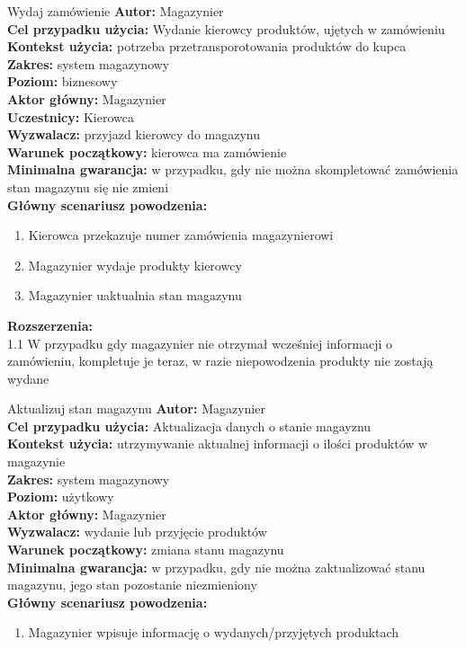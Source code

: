 \begin{usecase}{Wydaj zamówienie}
	\textbf{Autor:} Magazynier\\
	\textbf{Cel przypadku użycia:} Wydanie kierowcy produktów, ujętych w zamówieniu \\
	\textbf{Kontekst użycia:} potrzeba przetransporotowania produktów do kupca\\
	\textbf{Zakres:} system magazynowy \\
	\textbf{Poziom:} biznesowy \\
	\textbf{Aktor główny:} Magazynier \\
	\textbf{Uczestnicy:} Kierowca \\
	\textbf{Wyzwalacz:} przyjazd kierowcy do magazynu \\
	\textbf{Warunek początkowy:} kierowca ma zamówienie \\
	\textbf{Minimalna gwarancja:} w przypadku, gdy nie można skompletować zamówienia stan magazynu się nie zmieni \\
	\textbf{Główny scenariusz powodzenia:} 
		\begin{enumerate}
			\item Kierowca przekazuje numer zamówienia magazynierowi
			\item Magazynier wydaje produkty kierowcy
			\item Magazynier uaktualnia stan magazynu
		\end{enumerate}
	\textbf{Rozszerzenia:} \\
	1.1 W przypadku gdy magazynier nie otrzymał wcześniej informacji o zamówieniu, kompletuje je teraz, w razie niepowodzenia produkty nie zostają wydane\\
\end{usecase}

\begin{usecase}{Aktualizuj stan magazynu}
	\textbf{Autor:} Magazynier\\
	\textbf{Cel przypadku użycia:} Aktualizacja danych o stanie magayznu \\
	\textbf{Kontekst użycia:} utrzymywanie aktualnej informacji o ilości produktów w magazynie \\
	\textbf{Zakres:} system magazynowy \\
	\textbf{Poziom:} użytkowy \\
	\textbf{Aktor główny:} Magazynier \\
	\textbf{Wyzwalacz:} wydanie lub przyjęcie produktów \\
	\textbf{Warunek początkowy:} zmiana stanu magazynu \\
	\textbf{Minimalna gwarancja:} w przypadku, gdy nie można zaktualizować stanu magazynu, jego stan pozostanie niezmieniony \\
	\textbf{Główny scenariusz powodzenia:} 
		\begin{enumerate}
			\item Magazynier wpisuje informację o wydanych/przyjętych produktach
		\end{enumerate}
\end{usecase}

